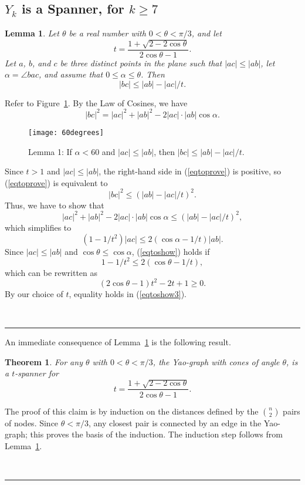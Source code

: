 \pdfoutput=1  \documentclass[11pt]{article}
\newtheorem{lemma}{Lemma}
\newtheorem{theorem}{Theorem}
\newcommand{\qed}{\rule{0.5em}{1.5ex}}
\newcommand{\fqed}{{\hfill~\qed}}
\newenvironment{proof}{{\noindent \bf Proof.}}
                      {{\hfill \fqed} \vspace{1em}}
\begin{document}
\subsection{$Y_k$ is a Spanner, for $k \ge 7$}
\begin{lemma}
Let $\theta$ be a real number with $0 < \theta < \pi/3$, and let
\[ t = \frac{1 + \sqrt{2 - 2 \cos\theta}}{2 \cos \theta -1} .
\]
Let $a$, $b$, and $c$ be three distinct points in the plane such that
$|ac| \leq |ab|$, let $\alpha = \angle{bac}$, and assume that
$0 \leq \alpha \leq \theta$. Then
\begin{equation}  \label{eqtoprove}
   |bc| \leq |ab| - |ac|/t .
\end{equation}
\label{lem:60degrees}
\end{lemma}
\begin{proof}
Refer to Figure~\ref{fig:60degrees}. By the Law of Cosines, we have
\[ |bc|^2 = |ac|^2 + |ab|^2 - 2 |ac| \cdot |ab| \cos \alpha .
\]
\begin{figure}[htbp]
\centering
\texttt{[image: 60degrees]}
\caption{Lemma 1: If $\alpha < 60$ and $|ac| \leq |ab|$, then $|bc| \leq |ab| - |ac|/t$.}
\label{fig:60degrees}
\end{figure}
Since $t>1$ and $|ac| \leq |ab|$, the right-hand side in
(\ref{eqtoprove}) is positive, so (\ref{eqtoprove}) is equivalent
to
\[ |bc|^2 \leq \left( |ab| - |ac|/t \right)^2 .
\]
Thus, we have to show that
\[ |ac|^2 + |ab|^2 - 2 |ac| \cdot |ab| \cos \alpha
      \leq \left( |ab| - |ac|/t \right)^2 ,
\]
which simplifies to
\begin{equation}     \label{eqtoshow}
    \left( 1 - 1/t^2 \right) |ac|
       \leq 2 (\cos \alpha - 1/t) |ab| .
\end{equation}
Since $|ac| \leq |ab|$ and $\cos \theta \leq \cos \alpha$,
(\ref{eqtoshow}) holds if
\[ 1 - 1/t^2 \leq 2 (\cos \theta - 1/t) ,
\]
which can be rewritten as
\begin{equation}     \label{eqtoshow3}
   ( 2 \cos \theta - 1 ) t^2 - 2t + 1 \geq 0 .
\end{equation}
By our choice of $t$, equality holds in (\ref{eqtoshow3}).
\end{proof}

\noindent
An immediate consequence of Lemma~\ref{lem:60degrees} is the
following result.
\begin{theorem}
For any $\theta$ with $0 < \theta < \pi/3$, the Yao-graph with cones of angle
$\theta$, is a $t$-spanner for
\[ t = \frac{1 + \sqrt{2 - 2 \cos\theta}}{2 \cos \theta -1} .
\]
\label{thm:Y6}
\end{theorem}
\begin{proof}
The proof of this claim is by induction on the distances defined by
the $n \choose 2$ pairs of nodes. Since $\theta < \pi/3$, any closest
pair is connected by an edge in the Yao-graph; this proves the
basis of the induction. The induction step follows from
Lemma~\ref{lem:60degrees}.
\end{proof}
\end{document}
